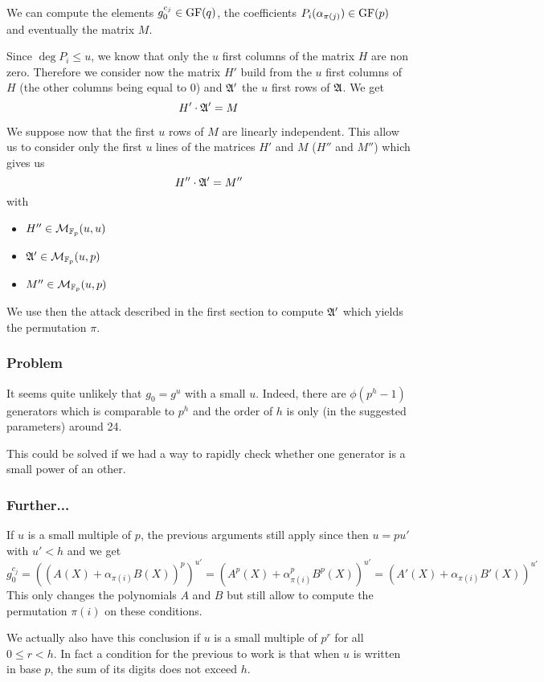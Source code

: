 \documentclass[12pt,a4paper,titlepage]{article}
\begin{document}
We can compute the elements $g_0^{c_j} \in \text{GF}(q)$, the coefficients $P_i(\alpha_{\pi(j)}) \in \text{GF}(p)$ and eventually the matrix $M$.

Since $\deg P_i \leq u$, we know that only the $u$ first columns of the matrix $H$ are non zero. Therefore we consider now the matrix $H'$ build from the $u$ first columns of $H$ (the other columns being equal to 0) and $\frak{A}'$ the $u$ first rows of $\frak{A}$.
We get
$$ H' \cdot \frak{A}' = M $$

We suppose now that the first $u$ rows of $M$ are linearly independent. This allow us to consider only the first $u$ lines of the matrices $H'$ and $M$ ($H''$ and $M''$) which gives us
$$ H'' \cdot \frak{A}' = M'' $$
with
\begin{itemize}
\item $H'' \in \mathcal{M}_{\mathbb{F}_p}(u,u)$
\item $\frak{A}' \in \mathcal{M}_{\mathbb{F}_p}(u,p)$
\item $M'' \in \mathcal{M}_{\mathbb{F}_p}(u,p)$
\end{itemize}

We use then the attack described in the first section to compute $\frak{A}'$ which yields the permutation $\pi$.

\subsubsection{Problem}
It seems quite unlikely that $g_0 = g^u$ with a small $u$.
Indeed, there are $\phi(p^h-1)$ generators which is comparable to $p^h$ and the order of $h$ is only (in the suggested parameters) around 24. 

This could be solved if we had a way to rapidly check whether one generator is a small power of an other.

\subsubsection{Further...}

If $u$ is a small multiple of $p$, the previous arguments still apply since then $u = p u'$ with $u' < h$ and we get
$$ g_0^{c_j} = \left( \left( A(X) + \alpha_{\pi(i)} B(X) \right)^p \right)^{u'} = \left( A^p(X) + \alpha_{\pi(i)}^p B^p(X) \right)^{u'} = \left( A'(X) + \alpha_{\pi(i)} B'(X) \right)^{u'}$$
This only changes the polynomials $A$ and $B$ but still allow to compute the permutation $\pi(i)$ on these conditions.

We actually also have this conclusion if $u$ is a small multiple of $p^r$ for all $0 \leq r < h$.
In fact a condition for the previous to work is that when $u$ is written in base $p$, the sum of its digits does not exceed $h$.
\end{document}
